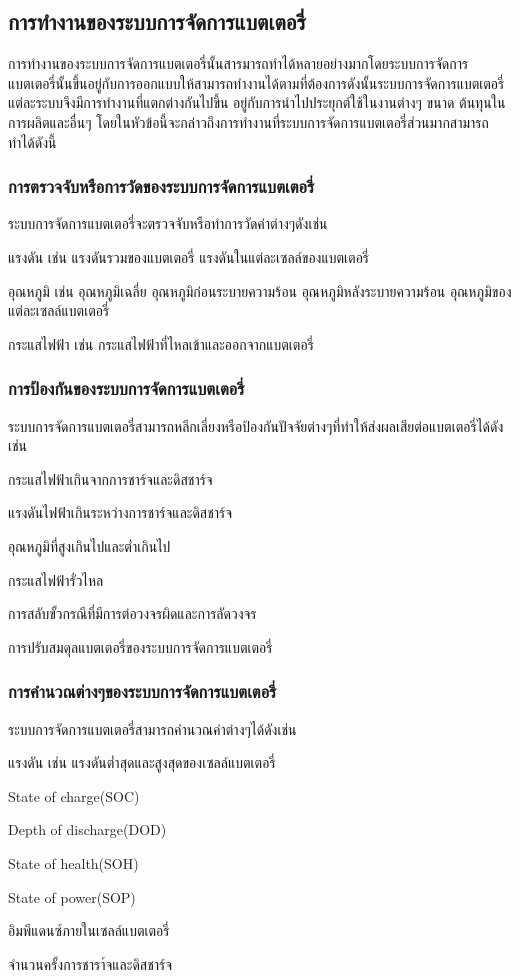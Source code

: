 \subsection{การทำงานของระบบการจัดการแบตเตอรี่}
การทำงานของระบบการจัดการแบตเตอรี่นั้นสารมารถทำได้หลายอย่างมากโดยระบบการจัดการแบตเตอรี่นั้นขึ้นอยู่กับการออกแบบให้สามารถทำงานได้ตามที่ต้องการดังนั้นระบบการจัดการแบตเตอรี่แต่ละระบบจึงมีการทำงานที่แตกต่างกันไปขึ้น
อยู่กับการนำไปประยุกต์ใช้ในงานต่างๆ ขนาด ต้นทุนในการผลิตและอื่นๆ โดยในหัวข้อนี้จะกล่าวถึงการทำงานที่ระบบการจัดการแบตเตอรี่ส่วนมากสามารถทำได้ดังนี้
\subsubsection*{การตรวจจับหรือการวัดของระบบการจัดการแบตเตอรี่}
ระบบการจัดการแบตเตอรี่จะตรวจจับหรือทำการวัดค่าต่างๆดังเช่น
\begin{itemize}
	{\item 	แรงดัน เช่น แรงดันรวมของแบตเตอรี่ แรงดันในแต่ละเซลล์ของแบตเตอรี่}
	{\item 	อุณหภูมิ เช่น อุณหภูมิเฉลี่ย อุณหภูมิก่อนระบายความร้อน อุณหภูมิหลังระบายความร้อน อุณหภูมิของแต่ละเซลล์แบตเตอรี่}
	{\item 	กระแสไฟฟ้า เช่น กระแสไฟฟ้าที่ไหลเข้าและออกจากแบตเตอรี่}
\end{itemize}
\subsubsection*{การป้องกันของระบบการจัดการแบตเตอรี่}
ระบบการจัดการแบตเตอรี่สามารถหลีกเลี่ยงหรือป้องกันปัจจัยต่างๆที่ทำให้ส่งผลเสียต่อแบตเตอรี่ได้ดังเช่น
\begin{itemize}
	{\item 	กระแสไฟฟ้าเกินจากการชาร์จและดิสชาร์จ}
	{\item 	แรงดันไฟฟ้าเกินระหว่างการชาร์จและดิสชาร์จ}
	{\item 	อุณหภูมิที่สูงเกินไปและต่ำเกินไป}
	{\item 	กระแสไฟฟ้ารั่วไหล}
	{\item 	การสลับขั้วกรณีที่มีการต่อวงจรผิดและการลัดวงจร}
	{\item 	การปรับสมดุลแบตเตอรี่ของระบบการจัดการแบตเตอรี่}
\end{itemize}
\subsubsection*{การคำนวณต่างๆของระบบการจัดการแบตเตอรี่}
ระบบการจัดการแบตเตอรี่สามารถคำนวณค่าต่างๆได้ดังเช่น
\begin{itemize}
	{\item 	แรงดัน เช่น แรงดันต่ำสุดและสูงสุดของเซลล์แบตเตอรี่}
	{\item 	State of charge(SOC)}
	{\item 	Depth of discharge(DOD)}
	{\item 	State of health(SOH)}
	{\item 	State of power(SOP)}
	{\item 	อิมพีแดนซ์ภายในเซลล์แบตเตอรี่}
	{\item 	จำนวนครั้งการชารา์จและดิสชาร์จ}
\end{itemize}
